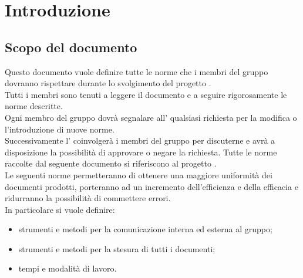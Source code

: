 %


\section{Introduzione}


\subsection{Scopo del documento}
Questo documento vuole definire tutte le norme che i membri del gruppo \goupName{} dovranno rispettare durante lo svolgimento del progetto \projectName.\\
Tutti i membri sono tenuti a leggere il documento e a seguire rigorosamente le norme descritte.\\
Ogni membro del gruppo dovrà segnalare all'\roleAdministrator{} qualsiasi richiesta per la modifica o l'introduzione di nuove norme.\\
Successivamente l'\roleAdministrator{} coinvolgerà i membri del gruppo per discuterne e avrà a disposizione la possibilità di approvare o negare la richiesta.
Tutte le norme raccolte dal seguente documento si riferiscono al progetto \projectName.\\
Le seguenti norme permetteranno di ottenere una maggiore uniformità dei documenti prodotti, porteranno ad un incremento dell'efficienza e della efficacia e ridurranno la possibilità di commettere errori.\\
In particolare si vuole definire:
\begin{itemize}
\item strumenti e metodi per la comunicazione interna ed esterna al gruppo;
\item strumenti e metodi per la stesura di tutti i documenti;
\item tempi e modalità di lavoro.
\end{itemize}





